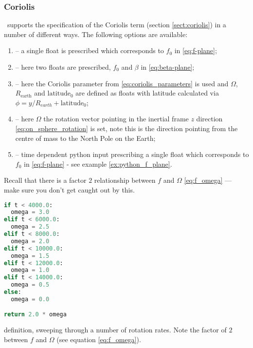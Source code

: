 \subsubsection{Coriolis}

\fluidity\ supports the specification of the Coriolis term (section
\ref{sect:coriolis}) in a number of different ways. The following options
are available:

\begin{enumerate}
  \item {} -- a single float is prescribed which corresponds to
        $f_0$ in \eqref{eq:f-plane};
  \item {} -- here two floats are prescribed, $f_0$ and
        $\beta$ in \eqref{eq:beta-plane};
  \item {} -- here the Coriolis parameter from
        \eqref{eq:coriolis_parameters} is used and $\Omega$, 
        $R_{\textrm{earth}}$ and $\textrm{latitude}_0$ are defined as floats with
        latitude calculated via 
        $\phi = y/R_{earth} + \textrm{latitude}_0$;
  \item {} -- here $\Omega$ the rotation vector pointing in the
        inertial frame $z$ direction  \eqref{eq:on_sphere_rotation} is set,
        note this is the direction pointing from the centre of mass to the North
        Pole on the Earth;
 \item {} -- time dependent python input
       prescribing a single float which corresponds to
       $f_0$ in \eqref{eq:f-plane} - see example \ref{ex:python_f_plane}.
\end{enumerate}

Recall that there is a factor $2$ relationship between $f$ and $\Omega$
\eqref{eq:f_omega} --- make sure you don't get caught out by this.

\begin{example}
\begin{lstlisting}[language = Python]
if t < 4000.0:
  omega = 3.0
elif t < 6000.0:
  omega = 2.5
elif t < 8000.0:
  omega = 2.0
elif t < 10000.0:
  omega = 1.5
elif t < 12000.0:
  omega = 1.0
elif t < 14000.0:
  omega = 0.5
else:
  omega = 0.0

return 2.0 * omega
\end{lstlisting}
\caption{ definition, sweeping through a number of
         rotation rates. Note the factor of $2$ between $f$ and $\Omega$ (see
         equation \eqref{eq:f_omega}).}
\label{ex:python_f_plane}
\end{example}


